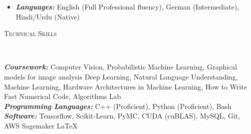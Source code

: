 \documentclass[9pt]{article}
\newenvironment{changemargin}[2]{%
  \begin{list}{}{%
      \setlength{\topsep}{0pt}%
    \setlength{\leftmargin}{#1}%
    \setlength{\rightmargin}{#2}%
    \setlength{\listparindent}{\parindent}%
  \setlength{\itemindent}{\parindent}%
    \setlength{\parsep}{\parskip}%
    }%
  \item[]}{\end{list}
    }
\newcommand{\lineover}{
  \begin{changemargin}{-0.05in}{-0.10in}
    \vspace*{-9pt}
    \hrulefill \\
    \vspace*{-2pt}
  \end{changemargin}
}
\newcommand{\header}[1]{
  \begin{changemargin}{-0.5in}{-0.5in}
    \scshape{#1}\\
        \lineover
  \end{changemargin}
}
\newenvironment{body} {
  \vspace*{-16pt}
        \begin{changemargin}{-0.6in}{-0.65in}
        }	
        {\end{changemargin}
}
\begin{document}
\begin{body}
\begin{changemargin}{0.15in}{0.15in}
\begin{itemize}
            \item \emph{\textbf{Languages:}} English (Full Professional fluency), 
              German (Intermediate), Hindi/Urdu (Native)
          \end{itemize}
        \end{changemargin}
\end{body}
\vspace{3 mm}
\header{Technical Skills}

\vspace{3 mm}
\begin{body}
  \vspace{14pt}
        \begin{changemargin}{0.15in}{0.15in}
          \emph{\textbf{Coursework:}} Computer Vision, Probabilistic Machine Learning,
          Graphical models for image analysis 
          Deep Learning, Natural Language Understanding, Machine 
          Learning, Hardware Architectures in Machine Learning, 
          How to Write Fast Numerical Code, Algorithms Lab \\
          \emph{\textbf{Programming Languages: }}{} C++ (Proficient), Python (Proficient), 
          Bash\\
          \emph{\textbf{Software: }}{} Tensorflow, Scikit-Learn, PyMC, CUDA (cuBLAS),
          MySQL, Git, AWS Sagemaker \LaTeX \\
        \end{changemargin}
\end{body}
\end{document}
